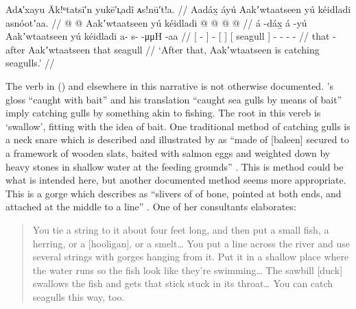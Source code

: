 \ex\label{ex:100-4-catching-gulls}%
%
\begingl
	\glpreamble	Adᴀ′xayu Āk!ᵘtatsī′n yukē′ʟ̣adî ᴀs!nū′t!a. //
	\glpreamble	Aadáx̱ áyú Aakʼwtaatseen yú kéidladi asnóotʼaa. //
	\gla	{}  @ {} {}  @ {} {} Aakʼwtaatseen {} {} yú kéidladi {}
			 @ {} @ {} @ {} @ {} //
	\glb	{} á -dáx̱ {} á -yú {} Aakʼwtaatseen {} {} yú kéidladi {}
			a- s-  -μμH -aa //
	\glc	{}[  - {}]  - {}[  {}] {}[  seagull {}]
			- -  - - //
	\gld	{} that -after {}  {} {} Aakʼwtaatseen {} {} that seagull {}
			 {} {} {} {} //
	\glft	‘After that, Aakʼwtaatseen is catching seagulls.’
		//
\endgl
\xe

The verb  in (\nextx) and elsewhere in this narrative is not otherwise documented.
\citeauthor{swanton:1909}’s gloss “caught with bait” \parencite[311.3]{swanton:1909} and his translation “caught sea gulls by means of bait” imply catching gulls by something akin to fishing.
The root in this vereb is  ‘swallow’, fitting with the idea of bait.
One traditional method of catching gulls is a neck snare which is described and illustrated by \citeauthor{emmons:1991} as “made of [baleen] secured to a framework of wooden slats, baited with salmon eggs and weighted down by heavy stones in shallow water at the feeding grounds” \parencite[138]{emmons:1991}.
This is method could be what is intended here, but another documented method seems more appropriate.
This is a gorge which \citeauthor{de-laguna:1972} describes as “slivers of of bone, pointed at both ends, and attached at the middle to a line” \parencite[373]{de-laguna:1972}.
One of her consultants elaborates:

\begin{quote}\small
You tie a string to it about four feet long, and then put a small fish, a herring, or a [hooligan], or a smelt… You put a line across the river and use several strings with gorges hanging from it.
Put it in a shallow place where the water runs so the fish look like they’re swimming… The sawbill [duck] swallows the fish and gets that stick stuck in its throat… You can catch seagulls this way, too.
\end{quote}

